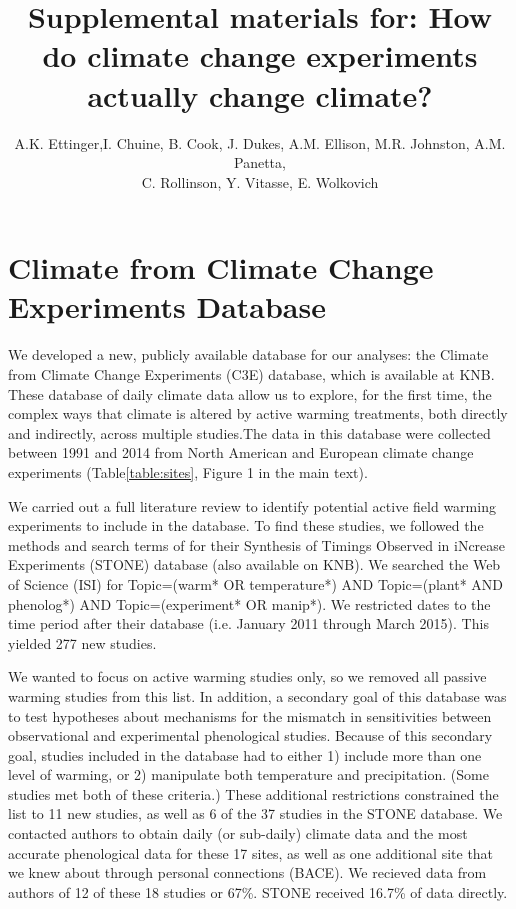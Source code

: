 \documentclass{article}
\begin{document}
 
\title{Supplemental materials for: How do climate change experiments actually change climate?} %

\author{A.K. Ettinger,I. Chuine, B. Cook, J. Dukes, A.M. Ellison, M.R. Johnston, A.M. Panetta,\\ C. Rollinson, Y. Vitasse, E. Wolkovich}
\maketitle  %


\section* {Climate from Climate Change Experiments Database}
\par We developed a new, publicly available database for our analyses: the Climate from Climate Change Experiments (C3E) database, which is available at KNB. These database of daily climate data allow us to explore, for the first time, the complex ways that climate is altered by active warming treatments, both directly and indirectly, across multiple studies.The data in this database were collected between 1991 and 2014 from North American and European climate change experiments (Table\ref{table:sites}, Figure 1 in the main text). 
 \par We carried out a full literature review to identify potential active field warming experiments to include in the database. To find these studies, we followed the methods and search terms of \citep{wolkovich2012} for their Synthesis of Timings Observed in iNcrease Experiments (STONE) database (also available on KNB). We searched the Web of Science (ISI) for Topic=(warm* OR temperature*) AND Topic=(plant* AND phenolog*) AND Topic=(experiment* OR manip*). We restricted dates to the time period after their database (i.e. January 2011 through March 2015). This yielded 277 new studies. 
 \par We wanted to focus on active warming studies only, so we removed all passive warming studies from this list. In addition, a secondary goal of this database was to test hypotheses about mechanisms for the mismatch in sensitivities between observational and experimental phenological studies. Because of this secondary goal, studies included in the database had to either 1) include more than one level of warming, or 2) manipulate both temperature and precipitation. (Some studies met both of these criteria.) These additional restrictions constrained the list to 11 new studies, as well as 6 of the 37 studies in the STONE database. We contacted authors to obtain daily (or sub-daily) climate data and the most accurate phenological data for these 17 sites, as well as one additional site that we knew about through personal connections (BACE).  We recieved data from authors of 12 of these 18 studies or 67\%. STONE received 16.7\% of data directly.
\end{document}
